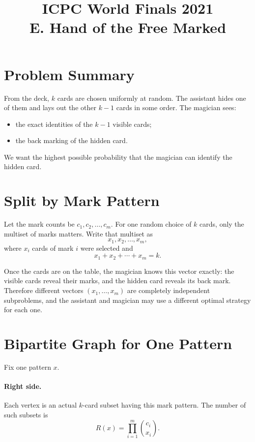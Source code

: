 \documentclass[11pt]{article}
\title{ICPC World Finals 2021\\E. Hand of the Free Marked}
\author{}
\date{}
\begin{document}
\maketitle

\section*{Problem Summary}

From the deck, $k$ cards are chosen uniformly at random. The assistant hides one of them and lays out the
other $k-1$ cards in some order. The magician sees:
\begin{itemize}[leftmargin=*]
    \item the exact identities of the $k-1$ visible cards;
    \item the back marking of the hidden card.
\end{itemize}

We want the highest possible probability that the magician can identify the hidden card.

\section*{Split by Mark Pattern}

Let the mark counts be $c_1, c_2, \dots, c_m$. For one random choice of $k$ cards, only the multiset of
marks matters. Write that multiset as
\[
    x_1, x_2, \dots, x_m,
\]
where $x_i$ cards of mark $i$ were selected and
\[
    x_1 + x_2 + \cdots + x_m = k.
\]

Once the cards are on the table, the magician knows this vector exactly: the visible cards reveal their
marks, and the hidden card reveals its back mark. Therefore different vectors $(x_1,\dots,x_m)$ are
completely independent subproblems, and the assistant and magician may use a different optimal strategy
for each one.

\section*{Bipartite Graph for One Pattern}

Fix one pattern $x$.

\paragraph{Right side.}
Each vertex is an actual $k$-card subset having this mark pattern. The number of such subsets is
\[
    R(x) = \prod_{i=1}^m \binom{c_i}{x_i}.
\]
\end{document}
